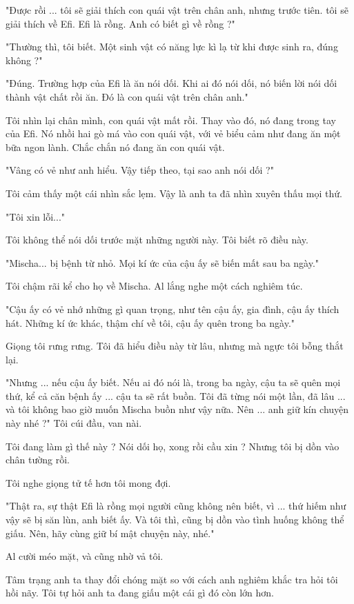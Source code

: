 "Được rồi ... tôi sẽ giải thích con quái vật trên chân anh, nhưng trước tiên. tôi sẽ giải thích về Efi. Efi là rồng. Anh có biết gì về rồng ?"

"Thường thì, tôi biết. Một sinh vật có năng lực kì lạ từ khi được sinh ra, đúng không ?"

"Đúng. Trường hợp của Efi là ăn nói dối. Khi ai đó nói dối, nó biến lời nói dối thành vật chất rồi ăn. Đó là con quái vật trên chân anh."

Tôi nhìn lại chân mình, con quái vật mất rồi. Thay vào đó, nó đang trong tay của Efi. Nó nhồi hai gò má vào con quái vật, với vẻ biểu cảm như đang ăn một bữa ngon lành. Chắc chắn nó đang ăn con quái vật.

"Vâng có vẻ như anh hiểu. Vậy tiếp theo, tại sao anh nói dối ?"

Tôi cảm thấy một cái nhìn sắc lẹm. Vậy là anh ta đã nhìn xuyên thấu mọi thứ.

"Tôi xin lỗi..."

Tôi không thể nói dối trước mặt những người này. Tôi biết rõ điều này.

"Mischa... bị bệnh từ nhỏ. Mọi kí ức của cậu ấy sẽ biến mất sau ba ngày."

Tôi chậm rãi kể cho họ về Mischa. Al lắng nghe một cách nghiêm túc.

"Cậu ấy có vẻ nhớ những gì quan trọng, như tên cậu ấy, gia đình, cậu ấy thích hát. Những kí ức khác, thậm chí về tôi, cậu ấy quên trong ba ngày."

Giọng tôi rưng rưng. Tôi đã hiểu điều này từ lâu, nhưng mà ngực tôi bỗng thắt lại.

"Nhưng ... nếu cậu ấy biết. Nếu ai đó nói là, trong ba ngày, cậu ta sẽ quên mọi thứ, kể cả căn bệnh ấy ... cậu ta sẽ rất buồn. Tôi đã từng nói một lần, đã lâu ... và tôi không bao giờ muốn Mischa buồn như vậy nữa. Nên ... anh giữ kín chuyện này nhé ?" Tôi cúi đầu, van nài.

Tôi đang làm gì thế này ? Nói dối họ, xong rồi cầu xin ? Nhưng tôi bị dồn vào chân tường rồi.

Tôi nghe giọng tử tế hơn tôi mong đợi.

"Thật ra, sự thật Efi là rồng mọi người cũng không nên biết, vì ... thứ hiếm như vậy sẽ bị săn lùn, anh biết ấy. Và tôi thì, cũng bị dồn vào tình huống không thể giấu. Nên, hãy cùng giữ bí mật chuyện này, nhé."

Al cười méo mặt, và cũng nhờ vả tôi.

Tâm trạng anh ta thay đổi chóng mặt so với cách anh nghiêm khắc tra hỏi tôi hồi nãy. Tôi tự hỏi anh ta đang giấu một cái gì đó còn lớn hơn.

